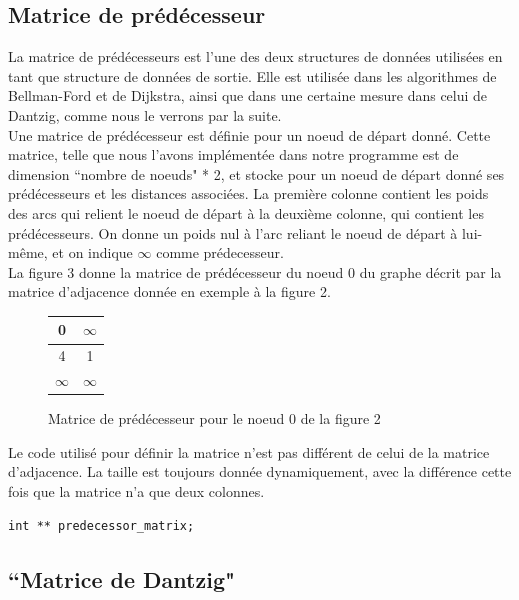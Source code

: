 \documentclass[a4paper,12pt,final] {article}
\begin{document}
\subsection{Matrice de prédécesseur}

La matrice de prédécesseurs est l'une des deux structures de données utilisées en tant que structure de données de sortie. Elle est utilisée dans les algorithmes de Bellman-Ford et de Dijkstra, ainsi que dans une certaine mesure dans celui de Dantzig, comme nous le verrons par la suite.\\

Une matrice de prédécesseur est définie pour un noeud de départ donné. Cette matrice, telle que nous l'avons implémentée dans notre programme est de dimension ``nombre de noeuds" * 2, et stocke pour un noeud de départ donné ses prédécesseurs et les distances associées. La première colonne contient les poids des arcs qui relient le noeud de départ à la deuxième colonne, qui contient les prédécesseurs. On donne un poids nul à l'arc reliant le noeud de départ  à lui-même, et on indique $\infty$ comme prédecesseur.\\

La figure 3 donne la matrice de prédécesseur du noeud 0 du graphe décrit par la matrice d'adjacence donnée en exemple à la figure 2.\\ %

\begin{figure}[htdp]
\begin{center}
\begin{tabular}{|c|c|}
\hline
0 &$\infty$\\
\hline
4 & 1 \\
\hline
$\infty$ & $\infty$ \\
\hline
\end{tabular}
\end{center}
\caption{Matrice de prédécesseur pour le noeud 0 de la figure 2}
\end{figure}%

Le code utilisé pour définir la matrice n'est pas différent de celui de la matrice d'adjacence. La taille est toujours donnée dynamiquement, avec la différence cette fois que la matrice n'a que deux colonnes.
\begin{lstlisting}
int ** predecessor_matrix;
\end{lstlisting}

\subsection{``Matrice de Dantzig"}
\end{document}
